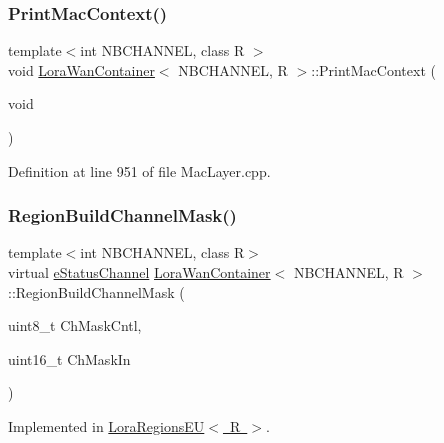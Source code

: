 \subsubsection{\texorpdfstring{Print\+Mac\+Context()}{PrintMacContext()}}
{\footnotesize\ttfamily template$<$int N\+B\+C\+H\+A\+N\+N\+EL, class R $>$ \\
void \mbox{\hyperlink{class_lora_wan_container}{Lora\+Wan\+Container}}$<$ N\+B\+C\+H\+A\+N\+N\+EL, R $>$\+::Print\+Mac\+Context (\begin{DoxyParamCaption}\item[{void}]{ }\end{DoxyParamCaption})\hspace{0.3cm}{\ttfamily [protected]}}



Definition at line 951 of file Mac\+Layer.\+cpp.

\mbox{\label{class_lora_wan_container_a7f0fbbcc4652885003a1db83aa28e507}} 
\subsubsection{\texorpdfstring{Region\+Build\+Channel\+Mask()}{RegionBuildChannelMask()}}
{\footnotesize\ttfamily template$<$int N\+B\+C\+H\+A\+N\+N\+EL, class R$>$ \\
virtual \mbox{\hyperlink{_define_8h_abbfbf157098d2505c0cf33877b128cc9}{e\+Status\+Channel}} \mbox{\hyperlink{class_lora_wan_container}{Lora\+Wan\+Container}}$<$ N\+B\+C\+H\+A\+N\+N\+EL, R $>$\+::Region\+Build\+Channel\+Mask (\begin{DoxyParamCaption}\item[{uint8\+\_\+t}]{Ch\+Mask\+Cntl,  }\item[{uint16\+\_\+t}]{Ch\+Mask\+In }\end{DoxyParamCaption})\hspace{0.3cm}{\ttfamily [pure virtual]}}



Implemented in \mbox{\hyperlink{class_lora_regions_e_u_af19055a7f2df125b3937ebaf033f50af}{Lora\+Regions\+E\+U$<$ R $>$}}.

\mbox{\label{class_lora_wan_container_a198e46f5b6358987f6ec0b91fdc8eab9}} 
